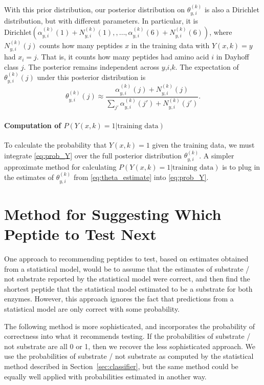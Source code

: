 \documentclass[12pt]{article}
\newcommand{\data}{\text{training data}}
\begin{document}
With this prior distribution, our posterior distribution on $\theta^{(k)}_{y,i}$ is also a Dirichlet distribution, but with different parameters.
In particular, it is
$\mathrm{Dirichlet}(
\alpha^{(k)}_{y,i}(1) + N^{(k)}_{y,i}(1),
,\ldots,
\alpha^{(k)}_{y,i}(6) + N^{(k)}_{y,i}(6))$,
where $N^{(k)}_{y,i}(j)$ counts how many peptides $x$ in the training data with $Y(x,k)=y$ had $x_i=j$.  That is, it counts how many peptides had amino acid $i$ in Dayhoff class $j$.
The posterior remains independent across $y$,$i$,$k$.
The expectation of $\theta^{(k)}_{y,i}(j)$ under this posterior distribution is
\begin{equation}
  \label{eq:theta_estimate}
  \theta^{(k)}_{y,i}(j) \approx
  \frac{\alpha^{(k)}_{y,i}(j) + N^{(k)}_{y,i}(j)}{\sum_{j'} \alpha^{(k)}_{y,i}(j') + N^{(k)}_{y,i}(j')}.
\end{equation}

\paragraph{Computation of $P(Y(x,k)=1 | \data)$}
To calculate the probability that $Y(x,k)=1$ given the training data, we must integrate \eqref{eq:prob_Y} over the full posterior distribution $\theta^{(k)}_{y,i}$.
A simpler approximate method for calculating $P(Y(x,k)=1 | \data)$ is to plug in the estimates of $\theta^{(k)}_{y,i}$ from \eqref{eq:theta_estimate} into \eqref{eq:prob_Y}.

\section{Method for Suggesting Which Peptide to Test Next}
\label{sec:design}
One approach to recommending peptides to test, based on estimates obtained from
a statistical model, would be to assume that the estimates of substrate / not
substrate reported by the statistical model were correct, and then find the
shortest peptide that the statistical model estimated to be a substrate for
both enzymes.  However, this approach ignores the fact that predictions from a
statistical model are only correct with some probability.

The following method is more sophisticated, and incorporates the probability of
correctness into what it recommends testing.  If the probabilities of substrate
/ not substrate are all 0 or 1, then we recover the less sophisticated approach.
We use the probabilities of substrate / not substrate as computed by the
statistical method described in Section~\ref{sec:classifier}, but the same
method could be equally well applied with probabilities estimated in another
way.
\end{document}
